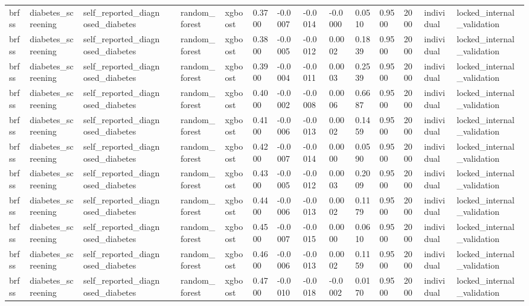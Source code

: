 \begin{tabular}{lllllllllllllll}
brfss & diabetes\_screening & self\_reported\_diagnosed\_diabetes &  & random\_forest & xgboost & 0.3700 & -0.0007 & -0.0014 & -0.0000 & 0.0510 & 0.9500 & 2000 & individual & locked\_internal\_validation \\
brfss & diabetes\_screening & self\_reported\_diagnosed\_diabetes &  & random\_forest & xgboost & 0.3800 & -0.0005 & -0.0012 & 0.0002 & 0.1839 & 0.9500 & 2000 & individual & locked\_internal\_validation \\
brfss & diabetes\_screening & self\_reported\_diagnosed\_diabetes &  & random\_forest & xgboost & 0.3900 & -0.0004 & -0.0011 & 0.0003 & 0.2539 & 0.9500 & 2000 & individual & locked\_internal\_validation \\
brfss & diabetes\_screening & self\_reported\_diagnosed\_diabetes &  & random\_forest & xgboost & 0.4000 & -0.0002 & -0.0008 & 0.0006 & 0.6687 & 0.9500 & 2000 & individual & locked\_internal\_validation \\
brfss & diabetes\_screening & self\_reported\_diagnosed\_diabetes &  & random\_forest & xgboost & 0.4100 & -0.0006 & -0.0013 & 0.0002 & 0.1459 & 0.9500 & 2000 & individual & locked\_internal\_validation \\
brfss & diabetes\_screening & self\_reported\_diagnosed\_diabetes &  & random\_forest & xgboost & 0.4200 & -0.0007 & -0.0014 & 0.0000 & 0.0590 & 0.9500 & 2000 & individual & locked\_internal\_validation \\
brfss & diabetes\_screening & self\_reported\_diagnosed\_diabetes &  & random\_forest & xgboost & 0.4300 & -0.0005 & -0.0012 & 0.0003 & 0.2009 & 0.9500 & 2000 & individual & locked\_internal\_validation \\
brfss & diabetes\_screening & self\_reported\_diagnosed\_diabetes &  & random\_forest & xgboost & 0.4400 & -0.0006 & -0.0013 & 0.0002 & 0.1179 & 0.9500 & 2000 & individual & locked\_internal\_validation \\
brfss & diabetes\_screening & self\_reported\_diagnosed\_diabetes &  & random\_forest & xgboost & 0.4500 & -0.0007 & -0.0015 & 0.0000 & 0.0610 & 0.9500 & 2000 & individual & locked\_internal\_validation \\
brfss & diabetes\_screening & self\_reported\_diagnosed\_diabetes &  & random\_forest & xgboost & 0.4600 & -0.0006 & -0.0013 & 0.0002 & 0.1159 & 0.9500 & 2000 & individual & locked\_internal\_validation \\
brfss & diabetes\_screening & self\_reported\_diagnosed\_diabetes &  & random\_forest & xgboost & 0.4700 & -0.0010 & -0.0018 & -0.0002 & 0.0170 & 0.9500 & 2000 & individual & locked\_internal\_validation \\

\end{tabular}
